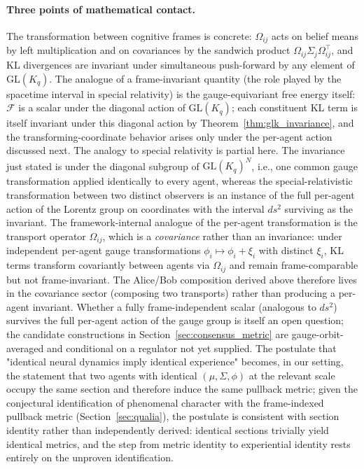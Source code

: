 \documentclass[11pt]{article}
\begin{document}
\paragraph{Three points of mathematical contact.}
The transformation between cognitive frames is concrete: $\Omega_{ij}$ acts on belief means by left multiplication and on covariances by the sandwich product $\Omega_{ij} \Sigma_j \Omega_{ij}^\top$, and KL divergences are invariant under simultaneous push-forward by any element of $\mathrm{GL}(K_q)$. The analogue of a frame-invariant quantity (the role played by the spacetime interval in special relativity) is the gauge-equivariant free energy itself: $\mathcal{F}$ is a scalar under the diagonal action of $\mathrm{GL}(K_q)$; each constituent KL term is itself invariant under this diagonal action by Theorem~\ref{thm:glk_invariance}, and the transforming-coordinate behavior arises only under the per-agent action discussed next. The analogy to special relativity is partial here. The invariance just stated is under the diagonal subgroup of $\mathrm{GL}(K_q)^N$, i.e., one common gauge transformation applied identically to every agent, whereas the special-relativistic transformation between two distinct observers is an instance of the full per-agent action of the Lorentz group on coordinates with the interval $ds^2$ surviving as the invariant. The framework-internal analogue of the per-agent transformation is the transport operator $\Omega_{ij}$, which is a \emph{covariance} rather than an invariance: under independent per-agent gauge transformations $\phi_i \mapsto \phi_i + \xi_i$ with distinct $\xi_i$, KL terms transform covariantly between agents via $\Omega_{ij}$ and remain frame-comparable but not frame-invariant. The Alice/Bob composition derived above therefore lives in the covariance sector (composing two transports) rather than producing a per-agent invariant. Whether a fully frame-independent scalar (analogous to $ds^2$) survives the full per-agent action of the gauge group is itself an open question; the candidate constructions in Section~\ref{sec:consensus_metric} are gauge-orbit-averaged and conditional on a regulator not yet supplied. The postulate that "identical neural dynamics imply identical experience" becomes, in our setting, the statement that two agents with identical $(\mu, \Sigma, \phi)$ at the relevant scale occupy the same section and therefore induce the same pullback metric; given the conjectural identification of phenomenal character with the frame-indexed pullback metric (Section~\ref{sec:qualia}), the postulate is consistent with section identity rather than independently derived: identical sections trivially yield identical metrics, and the step from metric identity to experiential identity rests entirely on the unproven identification.
\end{document}
